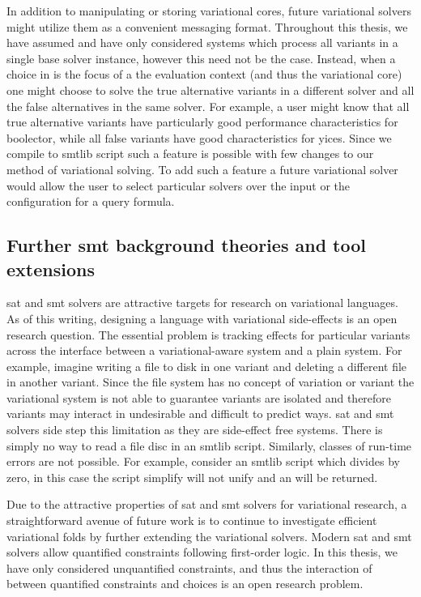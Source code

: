 In addition to manipulating or storing variational cores, future variational
solvers might utilize them as a convenient messaging format. Throughout this
thesis, we have assumed and have only considered systems which process all
variants in a single base solver instance, however this need not be the case.
Instead, when a choice in is the focus of a the evaluation context (and thus the
variational core) one might choose to solve the true alternative variants in a
different solver and all the false alternatives in the same solver. For example,
a user might know that all true alternative variants have particularly good
performance characteristics for boolector, while all false variants have good
characteristics for yices. Since we compile to \acl{smtlib} script such a
feature is possible with few changes to our method of variational solving. To
add such a feature a future variational solver would allow the user to select
particular solvers over the input \vc{} or the configuration for a query
formula.

\subsection{Further \ac{smt} background theories and tool extensions}
\ac{sat} and \ac{smt} solvers are attractive targets for research on variational
languages. As of this writing, designing a language with variational
side-effects is an open research question. The essential problem is tracking
effects for particular variants across the interface between a variational-aware
system and a plain system. For example, imagine writing a file to disk in one
variant and deleting a different file in another variant. Since the file system
has no concept of variation or variant the variational system is not able to
guarantee variants are isolated and therefore variants may interact in
undesirable and difficult to predict ways. \ac{sat} and \ac{smt} solvers side
step this limitation as they are side-effect free systems. There is simply no
way to read a file disc in an \acl{smtlib} script. Similarly, classes of
run-time errors are not possible. For example, consider an \acl{smtlib} script
which divides by zero, in this case the script simplify will not unify and an
 will be returned.

Due to the attractive properties of \ac{sat} and \ac{smt} solvers for
variational research, a straightforward avenue of future work is to continue to
investigate efficient variational folds by further extending the variational
solvers. Modern \ac{sat} and \ac{smt} solvers allow quantified constraints
following first-order logic. In this thesis, we have only considered
unquantified constraints, and thus the interaction of between quantified
constraints and choices is an open research problem.

